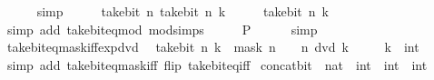 \begin{isabellebody}
\ \ \ \ \isamarkupfalse%
\ simp\isanewline
\ \ \isamarkupfalse%
\ \isamarkupfalse%
\ {\isacartoucheopen}take{\isacharunderscore}{\kern0pt}bit\ n\ {\isacharparenleft}{\kern0pt}take{\isacharunderscore}{\kern0pt}bit\ n\ {\isacharparenleft}{\kern0pt}k\ {\isacharplus}{\kern0pt}\ {}{\isacharparenright}{\kern0pt}\ {\isacharminus}{\kern0pt}\ {}{\isacharparenright}{\kern0pt}\ {\isacharequal}{\kern0pt}\ take{\isacharunderscore}{\kern0pt}bit\ n\ k{\isacartoucheclose}\isanewline
\ \ \ \ \isamarkupfalse%
\ {\isacharparenleft}{\kern0pt}simp\ add{\isacharcolon}{\kern0pt}\ take{\isacharunderscore}{\kern0pt}bit{\isacharunderscore}{\kern0pt}eq{\isacharunderscore}{\kern0pt}mod\ mod{\isacharunderscore}{\kern0pt}simps{\isacharparenright}{\kern0pt}\isanewline
\ \ \isamarkupfalse%
\ \isamarkupfalse%
\ {\isacharquery}{\kern0pt}P\isanewline
\ \ \ \ \isamarkupfalse%
\ simp\isanewline
{}\isamarkupfalse%
%
\endisatagproof
{\isafoldproof}%
%
\isadelimproof
\isanewline
%
\endisadelimproof
\isanewline
{}\isamarkupfalse%
\ take{\isacharunderscore}{\kern0pt}bit{\isacharunderscore}{\kern0pt}eq{\isacharunderscore}{\kern0pt}mask{\isacharunderscore}{\kern0pt}iff{\isacharunderscore}{\kern0pt}exp{\isacharunderscore}{\kern0pt}dvd{\isacharcolon}{\kern0pt}\isanewline
\ \ {\isacartoucheopen}take{\isacharunderscore}{\kern0pt}bit\ n\ k\ {\isacharequal}{\kern0pt}\ mask\ n\ {\isasymlongleftrightarrow}\ {}\ {\isacharcircum}{\kern0pt}\ n\ dvd\ k\ {\isacharplus}{\kern0pt}\ {}{\isacartoucheclose}\isanewline
\ \ \ k\ {\isacharcolon}{\kern0pt}{\isacharcolon}{\kern0pt}\ int\isanewline
%
\isadelimproof
\ \ %
\endisadelimproof
%
\isatagproof
{}\isamarkupfalse%
\ {\isacharparenleft}{\kern0pt}simp\ add{\isacharcolon}{\kern0pt}\ take{\isacharunderscore}{\kern0pt}bit{\isacharunderscore}{\kern0pt}eq{\isacharunderscore}{\kern0pt}mask{\isacharunderscore}{\kern0pt}iff\ flip{\isacharcolon}{\kern0pt}\ take{\isacharunderscore}{\kern0pt}bit{\isacharunderscore}{\kern0pt}eq{\isacharunderscore}{\kern0pt}{}{\isacharunderscore}{\kern0pt}iff{\isacharparenright}{\kern0pt}%
\endisatagproof
{\isafoldproof}%
%
\isadelimproof
%
\endisadelimproof
%
\isadelimdocument
%
\endisadelimdocument
%
\isatagdocument
%
\isamarkuptrue%
%
\endisatagdocument
{\isafolddocument}%
%
\isadelimdocument
%
\endisadelimdocument
{}\isamarkupfalse%
\ concat{\isacharunderscore}{\kern0pt}bit\ {\isacharcolon}{\kern0pt}{\isacharcolon}{\kern0pt}\ {\isacartoucheopen}nat\ {\isasymRightarrow}\ int\ {\isasymRightarrow}\ int\ {\isasymRightarrow}\ int{\isacartoucheclose}\isanewline

\end{isabellebody}
